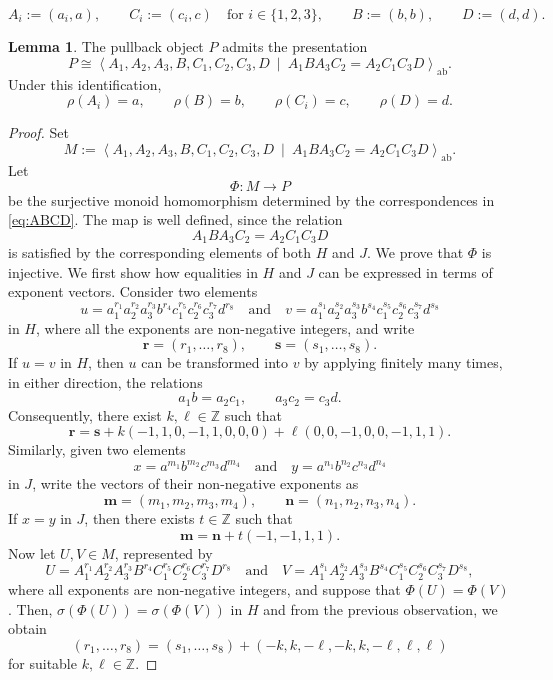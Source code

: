 \documentclass[a4paper,10pt,reqno]{amsart}
\theoremstyle{definition}
\newtheorem{lemma}[theorem]{Lemma}
\theoremstyle{remark}
\begin{document}
 \begin{equation}\label{eq:ABCD}
 A_i:=(a_i,a),\qquad C_i:=(c_i,c)
 \quad \text{for }i\in\{1,2,3\},\qquad 
 B:=(b,b),\qquad D:=(d,d).
 \end{equation}

\begin{lemma}\label{lem:pullback-presentation}
The pullback object \(P\) admits the presentation
$$
P\cong \left\langle A_1,A_2,A_3,B,C_1,C_2,C_3,D \ \middle|\ A_1BA_3C_2=A_2C_1C_3D \right\rangle_{\mathrm{ab}}.
$$
Under this identification,
$$
\rho(A_i)=a,\qquad \rho(B)=b,\qquad \rho(C_i)=c,\qquad \rho(D)=d.
$$
\end{lemma}

\begin{proof}
Set
$$ M:= \left\langle A_1,A_2,A_3,B,C_1,C_2,C_3,D \ \middle|\ A_1BA_3C_2=A_2C_1C_3D \right\rangle_{\mathrm{ab}}. $$ 
Let $$ \Phi:M\to P $$ be the surjective monoid homomorphism determined by the correspondences in \eqref{eq:ABCD}.
The map is well defined, since the relation
\begin{equation}\label{eq:relation-M}
A_1BA_3C_2=A_2C_1C_3D
\end{equation}
is satisfied by the corresponding elements of both $H$ and $J$. We prove that $\Phi$ is injective. We first show how equalities in $H$ and $J$ can be expressed in terms of exponent vectors. Consider two elements
$$
u=a_1^{r_1}a_2^{r_2}a_3^{r_3}b^{r_4} c_1^{r_5}c_2^{r_6}c_3^{r_7}d^{r_8} \quad \text{and} \quad v=a_1^{s_1}a_2^{s_2}a_3^{s_3}b^{s_4} c_1^{s_5}c_2^{s_6}c_3^{s_7}d^{s_8}
$$
in $H$, where all the exponents are non-negative integers, and write
$$
\mathbf r=(r_1,\ldots,r_8), \qquad \mathbf s=(s_1,\ldots,s_8).
$$
If $u=v$ in $H$, then $u$ can be transformed into $v$ by applying finitely many times, in either direction, the relations
$$
a_1b=a_2c_1, \qquad a_3c_2=c_3d.
$$
Consequently, there exist $k,\ell\in\mathbb Z$ such that
$$
\mathbf r = \mathbf s +k(-1,1,0,-1,1,0,0,0) +\ell(0,0,-1,0,0,-1,1,1).
$$
Similarly, given two elements
$$
x=a^{m_1}b^{m_2}c^{m_3}d^{m_4} \quad \text{and} \quad y=a^{n_1}b^{n_2}c^{n_3}d^{n_4}
$$ in $J$, write the vectors of their non-negative exponents as
$$
\mathbf m=(m_1,m_2,m_3,m_4), \qquad \mathbf n=(n_1,n_2,n_3,n_4).
$$
If $x=y$ in $J$, then there exists $t\in\mathbb Z$ such that
$$
\mathbf m=\mathbf n+t(-1,-1,1,1).
$$
Now let $U,V\in M$, represented by
$$
U= A_1^{r_1}A_2^{r_2}A_3^{r_3}B^{r_4} C_1^{r_5}C_2^{r_6}C_3^{r_7}D^{r_8} \quad \text{and} \quad V= A_1^{s_1}A_2^{s_2}A_3^{s_3}B^{s_4} C_1^{s_5}C_2^{s_6}C_3^{s_7}D^{s_8},
$$
where all exponents are non-negative integers, and suppose that $\Phi(U)=\Phi(V)$. Then, $\sigma(\Phi(U))=\sigma(\Phi(V))$ in $H$ and from the previous observation, we obtain
$$
(r_1,\ldots,r_8) = (s_1,\ldots,s_8) +(-k,k,-\ell,-k,k,-\ell,\ell,\ell)
$$
for suitable $k,\ell\in\mathbb Z$.


\end{proof}
\end{document}
